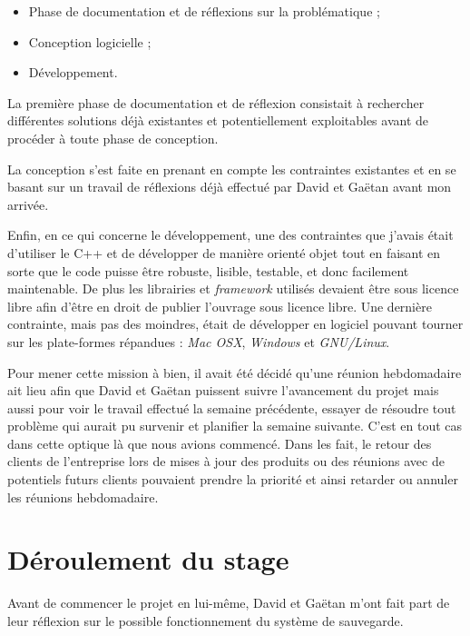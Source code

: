\documentclass[a4paper,10pt, twoside]{report}
\begin{document}
\begin{spacing}{1.2}
\begin{itemize}
 \item Phase de documentation et de réflexions sur la problématique ;
 \item Conception logicielle ;
 \item Développement.
\end{itemize}

La première phase de documentation et de réflexion consistait à
rechercher différentes solutions déjà existantes et potentiellement
exploitables avant de procéder à toute phase de conception.

La conception s'est faite en prenant en compte les contraintes existantes
et en se basant sur un travail de réflexions déjà effectué par David et
Gaëtan avant mon arrivée.

Enfin, en ce qui concerne le développement, une des contraintes que j'avais
était d'utiliser le C++ et de développer de manière orienté objet tout
en faisant en sorte que le code puisse être robuste, lisible, testable, et
donc facilement maintenable. De plus les librairies et \textit{framework}
utilisés devaient être sous licence libre afin d'être en droit de publier
l'ouvrage sous licence libre. Une dernière contrainte, mais pas des moindres,
était de développer en logiciel pouvant tourner sur les
plate-formes répandues : \textit{Mac OSX}, \textit{Windows} et
\textit{GNU/Linux}.

Pour mener cette mission à bien, il avait été décidé qu'une réunion
hebdomadaire ait lieu afin que David et Gaëtan puissent
suivre l'avancement du projet mais aussi pour voir le travail effectué la
semaine précédente, essayer de résoudre tout problème qui aurait pu
survenir et planifier la semaine suivante.
C'est en tout cas dans cette optique là que nous avions commencé. Dans les
fait, le retour des clients de l'entreprise lors de mises à jour des produits
ou des réunions avec de potentiels futurs clients pouvaient prendre la
priorité et ainsi retarder ou annuler les réunions hebdomadaire.

\chapter{Déroulement du stage}
\thispagestyle{fancy}
Avant de commencer le projet en lui-même, David et Gaëtan m'ont fait part
de leur réflexion sur le possible fonctionnement du système de sauvegarde.


\end{spacing}
\end{document}
